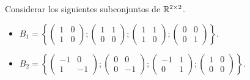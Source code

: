 \item Considerar los siguientes subconjuntos de $\mathbb{R}^{2\times2}$.
    \begin{itemize}
        \item $B_1=\left\{\begin{pmatrix}
                1&0\\1&0
            \end{pmatrix};\begin{pmatrix}
                1&1\\0&0
            \end{pmatrix};\begin{pmatrix}
                1&1\\1&0
            \end{pmatrix};\begin{pmatrix}
                0&0\\0&1
            \end{pmatrix}\right\}$.
        \item $B_2=\left\{\begin{pmatrix}
                -1&0\\1&-1
            \end{pmatrix};\begin{pmatrix}
                0&0\\0&-1
            \end{pmatrix};\begin{pmatrix}
                -1&1\\0&1
            \end{pmatrix};\begin{pmatrix}
                1&0\\0&0
            \end{pmatrix}\right\}$.
    \end{itemize}
